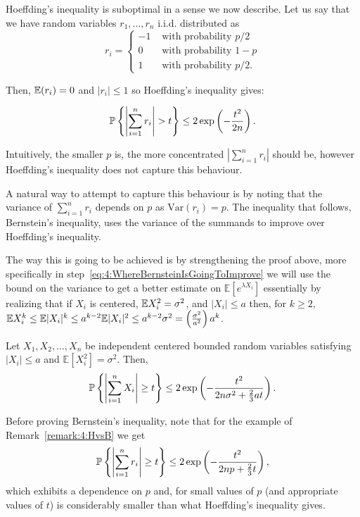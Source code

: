\begin{remark}\label{remark:4:HvsB}
Hoeffding's inequality is suboptimal in a sense we now describe. Let us say that we have random variables $r_1,\dots, r_n$ i.i.d. distributed as
\[
r_i = \left\{ \begin{array}{rl}
  -1 & \text{ with probability } p/2   \\
 0 & \text{ with probability }  1-p  \\
  1 & \text{ with probability } p/2.
            \end{array}    \right.
\]

Then, $\mathbb{E}(r_i)=0$ and $|r_i|\leq 1$ so Hoeffding's inequality gives:

\[
 \Prob\left\{\left|\sum_{i=1}^n r_i\right|>t\right\}\le 2\exp\left(-\displaystyle{\frac{t^2}{2n}}\right).
\]

Intuitively, the smaller $p$ is, the more concentrated $\left|\sum_{i=1}^n r_i\right|$ should be, however Hoeffding's inequality does not capture this behaviour.

\end{remark}

A natural way to attempt to capture this behaviour is by noting that the variance of $\sum_{i=1}^n r_i$ depends on $p$ as $\mathrm{Var}(r_i) = p$. The inequality that follows, Bernstein's inequality, uses the variance of the summands to improve over Hoeffding's inequality.

The way this is going to be achieved is by strengthening the proof above, more specifically in step~\eqref{eq:4:WhereBernsteinIsGoingToImprove} we will use the bound on the variance to get a better estimate on $\mathbb{E}[e^{\lambda X_i}]$ essentially by realizing that if $X_i$ is centered, $\mathbb{E} X_i^2 = \sigma^2$, and $|X_i|\leq a$ then, for $k\geq 2$, $\mathbb{E} X_i^k \leq \mathbb{E} |X_i|^k \leq a^{k-2}\mathbb{E} |X_i|^{2} \leq  a^{k-2} \sigma^2= \left( \frac{\sigma^2}{a^2} \right)a^k$.


\begin{theorem}\label{thm:Bernstein}

Let $X_1,X_2,\ldots,X_n$ be independent centered bounded random variables satisfying $|X_i| \leq a$ and %
 $\mathbb{E}[X_i^2]=\sigma^2$. Then,
$${\mathbb{P}} \left\{\left| \sum_{i=1}^n X_i \right| \geq t \right\} \leq 2\exp\left(-\frac{t^2}{2n\sigma^2 + \frac{2}{3}at}\right).$$
\end{theorem}

\begin{remark}

Before proving Bernstein's inequality, note that for the example of Remark~\ref{remark:4:HvsB} we get
\[
 {\mathbb{P}}\left\{\left|\sum_{i=1}^n r_i\right|\geq t\right\}\leq 2\exp\left(-\frac{t^2}{2np + \frac{2}{3}t}\right),
\]
which exhibits a dependence on $p$ and, for small values of $p$ (and appropriate values of $t$) is considerably smaller than what Hoeffding's inequality gives.
\end{remark}


